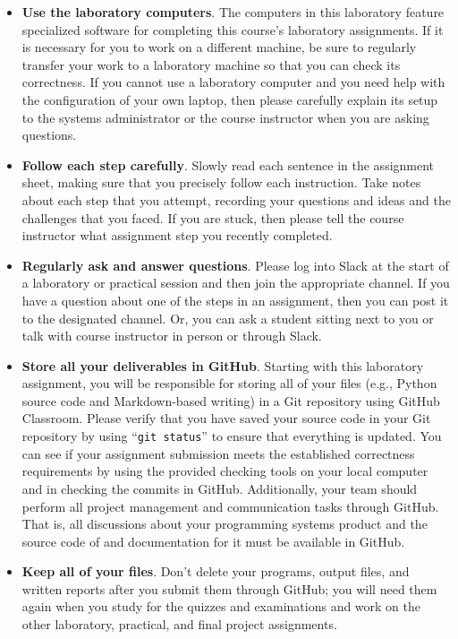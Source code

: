 \documentclass[11pt]{article}
\newcommand{\command}[1]{``\lstinline{#1}''}
\begin{document}
\begin{itemize}
  \setlength{\itemsep}{0pt}

\item {\bf Use the laboratory computers}. The computers in this laboratory feature specialized software for completing
  this course's laboratory  assignments. If it is necessary for you to work on a different machine, be sure to regularly
  transfer your work to a laboratory machine so that you can check its correctness. If you cannot use a laboratory
  computer and you need help with the configuration of your own laptop, then please carefully explain its setup to the
  systems administrator or the course instructor when you are asking questions.

\item {\bf Follow each step carefully}. Slowly read each sentence in the assignment sheet, making sure that you
  precisely follow each instruction. Take notes about each step that you attempt, recording your questions and ideas and
  the challenges that you faced. If you are stuck, then please tell the course instructor what assignment step you
  recently completed.

\item {\bf Regularly ask and answer questions}. Please log into Slack at the start of a laboratory or practical session
  and then join the appropriate channel. If you have a question about one of the steps in an assignment, then you can
  post it to the designated channel. Or, you can ask a student sitting next to you or talk with course instructor in
  person or through Slack.

\item {\bf Store all your deliverables in GitHub}. Starting with this laboratory assignment, you will be responsible for
  storing all of your files (e.g., Python source code and Markdown-based writing) in a Git repository using GitHub
  Classroom. Please verify that you have saved your source code in your Git repository by using \command{git status} to
  ensure that everything is updated. You can see if your assignment submission meets the established correctness
  requirements by using the provided checking tools on your local computer and in checking the commits in GitHub.
  Additionally, your team should perform all project management and communication tasks through GitHub. That is, all
  discussions about your programming systems product and the source code of and documentation for it must be available
  in GitHub.

\item {\bf Keep all of your files}. Don't delete your programs, output files, and written reports after you submit them
  through GitHub; you will need them again when you study for the quizzes and examinations and work on the other
  laboratory, practical, and final project assignments.


\end{itemize}
\end{document}
